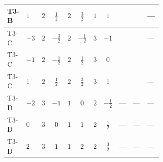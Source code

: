 \documentclass[8pt]{article}
\begin{document}
\begin{landscape}
\begin{longtable}{@{}llcccccc >{\raggedright\arraybackslash}p{0.21\linewidth} >{\raggedright\arraybackslash}p{0.21\linewidth} >{\raggedright\arraybackslash}p{0.21\linewidth}@{}}
\midrule
T3-B & $1$ & $2$ & $\frac{1}{2}$ & $2$ & $\frac{3}{2}$ & $1$ & $1$ & \scriptsize\adjustbox{max width=\linewidth}{$\begin{gathered} -\frac{9 {g_2}^2 {m_2^2}}{2}\end{gathered}$} & \scriptsize\adjustbox{max width=\linewidth}{$\begin{gathered} -\frac{27 {g_1}^2 {m_2^2}}{2}\end{gathered}$} & --- \\
\midrule
T3-C & $-3$ & $2$ & $-\frac{3}{2}$ & $2$ & $-\frac{1}{2}$ & $3$ & $-1$ & \scriptsize\adjustbox{max width=\linewidth}{$\begin{gathered} -\frac{9 {g_2}^2 {m_2^2}}{2}\end{gathered}$} & \scriptsize\adjustbox{max width=\linewidth}{$\begin{gathered} -\frac{3 {g_1}^2 {m_2^2}}{2}\end{gathered}$} & --- \\
\midrule
T3-C & $-1$ & $2$ & $-\frac{1}{2}$ & $2$ & $\frac{1}{2}$ & $3$ & $0$ & \scriptsize\adjustbox{max width=\linewidth}{$\begin{gathered} -\frac{9 {g_2}^2 {m_2^2}}{2}\end{gathered}$} & \scriptsize\adjustbox{max width=\linewidth}{$\begin{gathered} -\frac{3 {g_1}^2 {m_2^2}}{2}\end{gathered}$} & \scriptsize\adjustbox{max width=\linewidth}{$\begin{gathered} -12 \operatorname{Tr}\!\left({M_F}\,\left({M_F}\right)^{*}\,\left({y_2}\right)^{T}\,\left({y_2}\right)^{*}\right)\end{gathered}$} \\
\midrule
T3-C & $1$ & $2$ & $\frac{1}{2}$ & $2$ & $\frac{3}{2}$ & $3$ & $1$ & \scriptsize\adjustbox{max width=\linewidth}{$\begin{gathered} -\frac{9 {g_2}^2 {m_2^2}}{2}\end{gathered}$} & \scriptsize\adjustbox{max width=\linewidth}{$\begin{gathered} -\frac{27 {g_1}^2 {m_2^2}}{2}\end{gathered}$} & --- \\
\midrule
T3-D & $-2$ & $3$ & $-1$ & $1$ & $0$ & $2$ & $-\frac{1}{2}$ & --- & --- & --- \\
\midrule
T3-D & $0$ & $3$ & $0$ & $1$ & $1$ & $2$ & $\frac{1}{2}$ & --- & --- & --- \\
\midrule
T3-D & $2$ & $3$ & $1$ & $1$ & $2$ & $2$ & $\frac{3}{2}$ & --- & --- & --- \\

\end{longtable}
\end{landscape}
\end{document}

